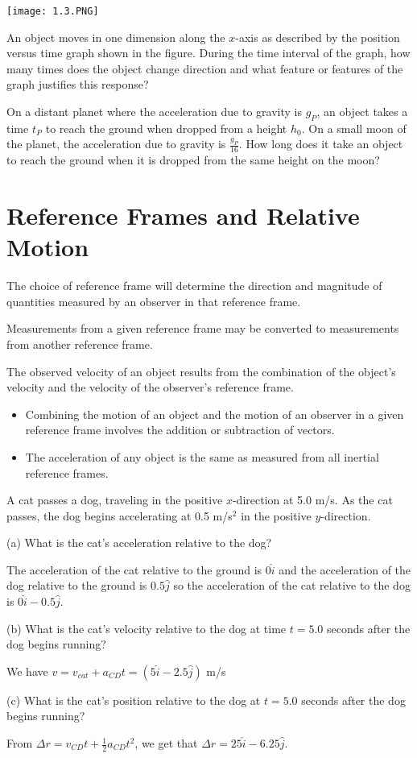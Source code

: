 \documentclass[../mech.tex]{subfiles}
\begin{document}
\ex \begin{center}
    \texttt{[image: 1.3.PNG]}
\end{center}
An object moves in one dimension along the $x$-axis as described by the position versus time graph shown in the figure. During the time interval of the graph, how many times does the object change direction and what feature or features of the graph justifies this response?

\ex On a distant planet where the acceleration due to gravity is $g_P$, an object takes a time $t_P$ to reach the ground when dropped from a height $h_0$. On a small moon of the planet, the acceleration due to gravity is $\frac{g_P}{16}$. How long does it take an object to reach the ground when it is dropped from the same height on the moon?

\section{Reference Frames and Relative Motion}
The choice of reference frame will determine the direction and magnitude of quantities measured by an observer in that reference frame.

Measurements from a given reference frame may be converted to measurements from another reference frame.

The observed velocity of an object results from the combination of the object's velocity and the velocity of the observer's reference frame.
\begin{itemize}
    \item Combining the motion of an object and the motion of an observer in a given reference frame involves the addition or subtraction of vectors.
    \item The acceleration of any object is the same as measured from all inertial reference frames.
\end{itemize}

\begin{example}
    A cat passes a dog, traveling in the positive $x$-direction at 5.0 m/s. As the cat passes, the dog begins accelerating at 0.5 m/s$^2$ in the positive $y$-direction.

    (a) What is the cat's acceleration relative to the dog?

    The acceleration of the cat relative to the ground is $0\hat{i}$ and the acceleration of the dog relative to the ground is $0.5\hat{j}$ so the acceleration of the cat relative to the dog is $0\hat{i}-0.5\hat{j}$.
    
    (b) What is the cat's velocity relative to the dog at time $t=5.0$ seconds after the dog begins running?

    We have $v=v_{cat}+a_{CD}t = (5\hat{i}-2.5\hat{j})$ m/s 

    (c) What is the cat's position relative to the dog at $t=5.0$ seconds after the dog begins running?
    
    From $\Delta r = v_{CD}t+\frac{1}{2}a_{CD}t^2$, we get that $\Delta r = 25\hat{i}-6.25\hat{j}$.
\end{example}
\end{document}
